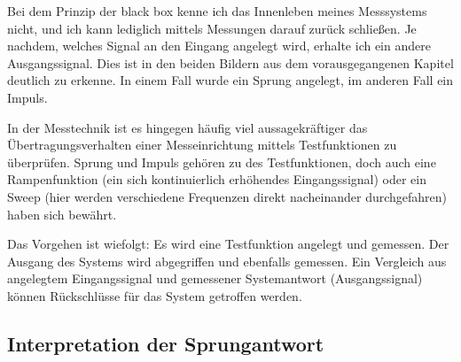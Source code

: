 \documentclass[letterpaper,10pt,english]{jupyterBook}
\begin{document}
\sphinxAtStartPar
Bei dem Prinzip der black box kenne ich das Innenleben meines Messsystems nicht, und ich kann lediglich mittels Messungen darauf zurück schließen. Je nachdem, welches Signal an den Eingang angelegt wird, erhalte ich ein andere Ausgangssignal. Dies ist in den beiden Bildern aus dem vorausgegangenen Kapitel deutlich zu erkenne. In einem Fall wurde ein Sprung angelegt, im anderen Fall ein Impuls.

\sphinxAtStartPar
In der Messtechnik ist es hingegen häufig viel aussagekräftiger das Übertragungsverhalten einer Messeinrichtung mittels Testfunktionen zu überprüfen. Sprung und Impuls gehören zu des Testfunktionen, doch auch eine Rampenfunktion (ein sich kontinuierlich erhöhendes Eingangssignal) oder ein Sweep (hier werden verschiedene Frequenzen direkt nacheinander durchgefahren) haben sich bewährt.

\sphinxAtStartPar
{}

\sphinxAtStartPar
Das Vorgehen ist wiefolgt: Es wird eine Testfunktion angelegt und gemessen. Der Ausgang des Systems wird abgegriffen und ebenfalls gemessen. Ein Vergleich aus angelegtem Eingangssignal und gemessener Systemantwort (Ausgangssignal) können Rückschlüsse für das System getroffen werden.


\subsection{Interpretation der Sprungantwort}
\label{\detokenize{content/5_ImpulsSprung:interpretation-der-sprungantwort}}
\sphinxAtStartPar
\end{document}
